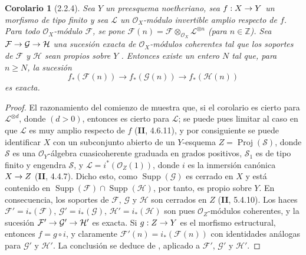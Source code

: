 \documentclass[10pt,oneside,openany]{book}
\theoremstyle{egaenv}\newtheorem*{env}{---}
\theoremstyle{egastatement}
\newtheorem*{corollary}{Corolario}
\theoremstyle{egadescription}
\newcommand{\oldpage}[2][]{\marginnote{\normalfont\scriptsize\textbf{#1}\,|\,#2}\ignorespaces}
\renewcommand{\geq}{\geqslant}
\renewcommand{\to}{\mathchoice{\longrightarrow}{\rightarrow}{\rightarrow}{\rightarrow}}
\begin{document}
\oldpage[III]{102}

\begin{corollary}[2.2.4]
\label{III.2.2.4}
\label{III.2.2.4-fr}
Sea $Y$ un preesquema noetheriano, sea $f:X\to Y$ un morfismo de tipo finito y sea $\mathcal L$ un $\mathcal O_X$-módulo invertible amplio respecto de $f$.
Para todo $\mathcal O_X$-módulo $\mathcal F$, se pone
$\mathcal F(n)=\mathcal F\otimes_{\mathcal O_X}\mathcal L^{\otimes n}$
(para $n\in\mathbb Z$). Sea
$\mathcal F\to\mathcal G\to\mathcal H$
una sucesión exacta de $\mathcal O_X$-módulos coherentes tal que los soportes de $\mathcal F$ y $\mathcal H$ sean propios sobre $Y$ \textup{}.
Entonces existe un entero $N$ tal que, para $n\geq N$, la sucesión
\[
f_*(\mathcal F(n))\longrightarrow f_*(\mathcal G(n))
\longrightarrow f_*(\mathcal H(n))
\]
es exacta.
\end{corollary}

\begin{proof}
El razonamiento del comienzo de  muestra que, si el corolario es cierto para $\mathcal L^{\otimes d}$, donde $(d>0)$, entonces es cierto para $\mathcal L$; se puede pues limitar al caso en que $\mathcal L$ es muy amplio respecto de $f$ (\textbf{II}, 4.6.11), y por consiguiente se puede identificar $X$ con un subconjunto abierto de un $Y$-esquema
$Z=\operatorname{Proj}(\mathcal S)$,
donde $\mathcal S$ es una $\mathcal O_Y$-álgebra cuasicoherente graduada en grados positivos, $\mathcal S_1$ es de tipo finito y engendra $\mathcal S$, y
$\mathcal L=i^*(\mathcal O_Z(1))$, donde $i$ es la inmersión
canónica $X\to Z$ (\textbf{II}, 4.4.7). Dicho esto, como
$\operatorname{Supp}(\mathcal G)$ es cerrado en $X$ y está contenido en
$\operatorname{Supp}(\mathcal F)\cap\operatorname{Supp}(\mathcal H)$,
por tanto, es propio sobre $Y$.
En consecuencia, los soportes de $\mathcal F$, $\mathcal G$ y $\mathcal H$ son cerrados en $Z$ (\textbf{II}, 5.4.10). Los haces
$\mathcal F'=i_*(\mathcal F)$, $\mathcal G'=i_*(\mathcal G)$,
$\mathcal H'=i_*(\mathcal H)$ son pues $\mathcal O_Z$-módulos coherentes, y la sucesión
$\mathcal F'\to\mathcal G'\to\mathcal H'$
es exacta.
Si $g:Z\to Y$ es el morfismo estructural, entonces $f=g\circ i$, y claramente
$\mathcal F'(n)=i_*(\mathcal F(n))$
con identidades análogas para $\mathcal G'$ y $\mathcal H'$.
La conclusión se deduce de , aplicado a $\mathcal F'$, $\mathcal G'$ y $\mathcal H'$.
\end{proof}
\end{document}
